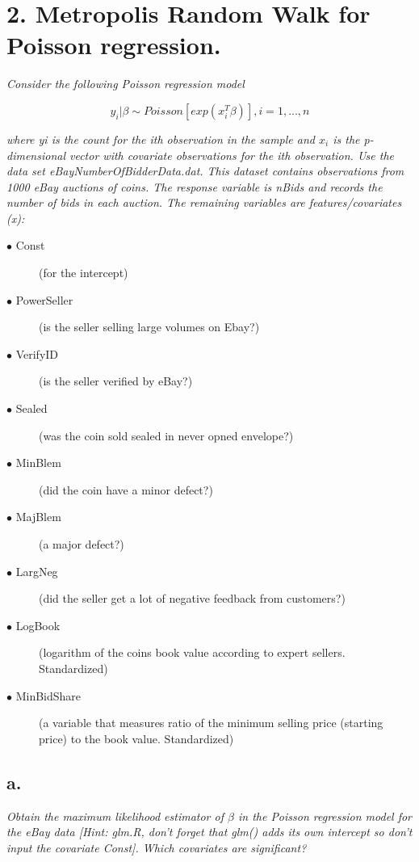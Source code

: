 \documentclass[]{article}
\begin{document}
\newpage

\hypertarget{metropolis-random-walk-for-poisson-regression.}{%
\section{2. Metropolis Random Walk for Poisson
regression.}\label{metropolis-random-walk-for-poisson-regression.}}

\emph{Consider the following Poisson regression model}

\[y_i|\beta\sim Poisson[exp(x_i^T \beta)],i=1,...,n\]

\emph{where yi is the count for the ith observation in the sample and
\(x_i\) is the p-dimensional vector with covariate observations for the
ith observation. Use the data set eBayNumberOfBidderData.dat. This
dataset contains observations from 1000 eBay auctions of coins. The
response variable is nBids and records the number of bids in each
auction. The remaining variables are features/covariates (x):}

\begin{description}
\item[$\bullet$ Const] (for the intercept)
\item[$\bullet$ PowerSeller] (is the seller selling large volumes on Ebay?)
\item[$\bullet$ VerifyID] (is the seller verified by eBay?)
\item[$\bullet$ Sealed] (was the coin sold sealed in never opned envelope?)
\item[$\bullet$ MinBlem] (did the coin have a minor defect?)
\item[$\bullet$ MajBlem] (a major defect?)
\item[$\bullet$ LargNeg] (did the seller get a lot of negative feedback from customers?)
\item[$\bullet$ LogBook] (logarithm of the coins book value according to expert sellers. Standardized)
\item[$\bullet$ MinBidShare] (a variable that measures ratio of the minimum selling price (starting price) to the book value. Standardized)
\end{description}

\hypertarget{a.}{%
\subsection{a.}\label{a.}}

\emph{Obtain the maximum likelihood estimator of \(\beta\) in the
Poisson regression model for the eBay data {[}Hint: glm.R, don't forget
that glm() adds its own intercept so don't input the covariate Const{]}.
Which covariates are significant?}
\end{document}
